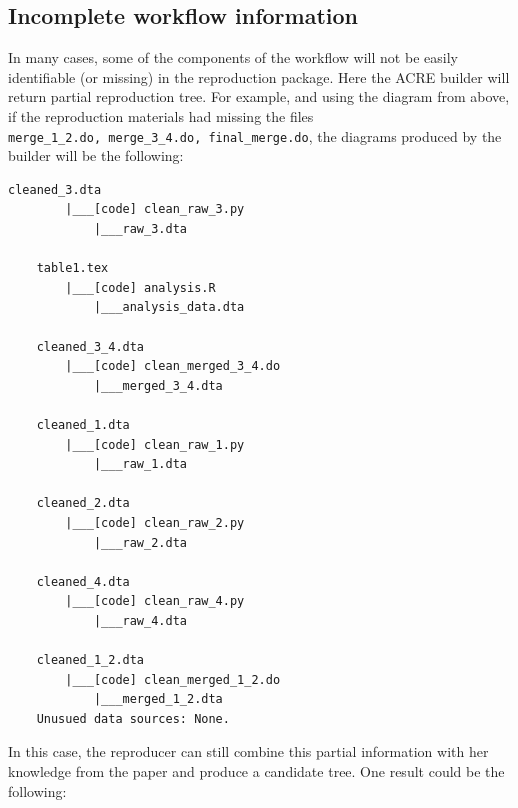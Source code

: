 \documentclass[]{book}
\begin{document}
\hypertarget{incomplete-workflow-information}{%
\subsection{Incomplete workflow information}\label{incomplete-workflow-information}}

In many cases, some of the components of the workflow will not be easily identifiable (or missing) in the reproduction package. Here the ACRE builder will return partial reproduction tree. For example, and using the diagram from above, if the reproduction materials had missing the files \texttt{merge\_1\_2.do,\ merge\_3\_4.do,\ final\_merge.do}, the diagrams produced by the builder will be the following:

\begin{verbatim}
cleaned_3.dta
        |___[code] clean_raw_3.py
            |___raw_3.dta
    
    table1.tex
        |___[code] analysis.R
            |___analysis_data.dta
    
    cleaned_3_4.dta
        |___[code] clean_merged_3_4.do
            |___merged_3_4.dta
    
    cleaned_1.dta
        |___[code] clean_raw_1.py
            |___raw_1.dta
    
    cleaned_2.dta
        |___[code] clean_raw_2.py
            |___raw_2.dta
    
    cleaned_4.dta
        |___[code] clean_raw_4.py
            |___raw_4.dta
    
    cleaned_1_2.dta
        |___[code] clean_merged_1_2.do
            |___merged_1_2.dta
    Unusued data sources: None.
\end{verbatim}

In this case, the reproducer can still combine this partial information with her knowledge from the paper and produce a candidate tree. One result could be the following:
\end{document}
